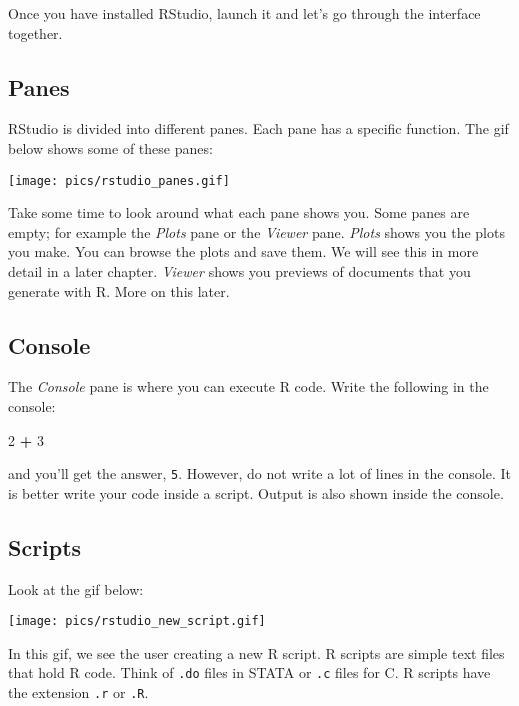 \documentclass[
]{article}
\newenvironment{Shaded}{\begin{snugshade}}{\end{snugshade}}
\newcommand{\DecValTok}[1]{\textcolor[rgb]{0.00,0.00,0.81}{#1}}
\newcommand{\OperatorTok}[1]{\textcolor[rgb]{0.81,0.36,0.00}{\textbf{#1}}}
\newcommand{\StringTok}[1]{\textcolor[rgb]{0.31,0.60,0.02}{#1}}
\begin{document}
Once you have installed RStudio, launch it and let's go through the interface together.

\hypertarget{panes}{%
\subsection{Panes}\label{panes}}

RStudio is divided into different panes. Each pane has a specific function. The gif below shows
some of these panes:

\texttt{[image: pics/rstudio\_panes.gif]}

Take some time to look around what each pane shows you. Some panes are empty; for example the \emph{Plots}
pane or the \emph{Viewer} pane. \emph{Plots} shows you the plots you make. You can browse the plots and save
them. We will see this in more detail in a later chapter. \emph{Viewer} shows you previews of documents
that you generate with R. More on this later.

\hypertarget{console}{%
\subsection{Console}\label{console}}

The \emph{Console} pane is where you can execute R code. Write the following in the console:

\begin{Shaded}
\begin{Highlighting}[]
\DecValTok{2} \OperatorTok{+}\StringTok{ }\DecValTok{3}
\end{Highlighting}
\end{Shaded}

and you'll get the answer, \texttt{5}. However, do not write a lot of lines in the console. It is better
write your code inside a script. Output is also shown inside the console.

\hypertarget{scripts}{%
\subsection{Scripts}\label{scripts}}

Look at the gif below:

\texttt{[image: pics/rstudio\_new\_script.gif]}

In this gif, we see the user creating a new R script. R scripts are simple text files that hold R
code. Think of \texttt{.do} files in STATA or \texttt{.c} files for C. R scripts have the extension \texttt{.r} or \texttt{.R}.
\end{document}
